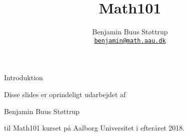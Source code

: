 \documentclass[aspectratio=169,10pt]{beamer}
\title{Math101}
\date{}
\author{Benjamin Buus Støttrup\\
   \href{mailto:benjamin@math.aau.dk}{{\tt benjamin@math.aau.dk}}
}
\institute[
  Institut for matematiske fag\\
  Aalborg universitet\\
  Danmark
] %
{%
  Institut for matematiske fag\\
  Aalborg universitet\\
  Danmark\\
  
}
\begin{document}
{\aauwavesbg%
\begin{frame} %
  \titlepage
\end{frame}}

\begin{frame}{Introduktion}{}
\begin{center}
 {\Large  Disse slides er oprindeligt udarbejdet af
 \vspace{1cm}

  Benjamin Buus Støttrup
  \vspace{1cm}

  til Math101 kurset på Aalborg Universitet i efteråret 2018. }
\vspace{0.5cm}



\end{center}
\vfill
\doclicenseThis
\end{frame}

% 
% 
% 
% 
% 
% 
% 



{\aauwavesbg
\begin{frame}
\end{frame}}
\end{document}

